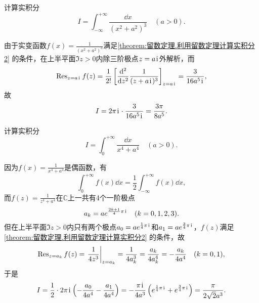 \begin{example}
计算实积分\[
I = \int_{-\infty}^{+\infty} \frac{\dd{x}}{(x^2+a^2)^3} \quad(a>0).
\]
\begin{solution}
由于实变函数\(f(x) = \frac{1}{(x^2+a^2)^3}\)满足\cref{theorem:留数定理.利用留数定理计算实积分2} 的条件，在上半平面\(\Im z > 0\)内除三阶极点\(z=a\kern1pt\mathrm{i}\kern1pt\)外解析，而\[
\operatorname{Res}_{z=a\kern1pt\mathrm{i}\kern1pt} f(z)
= \frac{1}{2!} \left[ \dv[2]{z} \frac{1}{(z+a\kern1pt\mathrm{i}\kern1pt)^3} \right]_{z=a\kern1pt\mathrm{i}\kern1pt}
= \frac{3}{16a^5\kern1pt\mathrm{i}\kern1pt},
\]故\[
I = 2\pi\kern1pt\mathrm{i}\kern1pt \cdot \frac{3}{16a^5\kern1pt\mathrm{i}\kern1pt} = \frac{3\pi}{8a^5}.
\]
\end{solution}
\end{example}

\begin{example}
计算实积分\[
I = \int_0^{+\infty} \frac{\dd{x}}{x^4+a^4} \quad(a>0).
\]
\begin{solution}
因为\(f(x) = \frac{1}{x^4+a^4}\)是偶函数，有\[
\int_0^{+\infty} f(x) \dd{x} = \frac{1}{2} \int_{-\infty}^{+\infty} f(x) \dd{x},
\]而\(f(z) = \frac{1}{z^4+a^4}\)在\(\mathbb{C}\)上一共有4个一阶极点\[
a_k = a e^{\frac{2k+1}{4}\pi\kern1pt\mathrm{i}\kern1pt} \quad(k=0,1,2,3).
\]但在上半平面\(\Im z > 0\)内只有两个极点\(a_0 = a e^{\frac{1}{4}\pi\kern1pt\mathrm{i}\kern1pt}\)和\(a_1 = a e^{\frac{3}{4}\pi\kern1pt\mathrm{i}\kern1pt}\)，\(f(z)\)满足\cref{theorem:留数定理.利用留数定理计算实积分2} 的条件，故\[
\Res_{z=a_k} f(z)
= \eval{\frac{1}{4z^3}}_{z=a_k}
= \frac{1}{4a_k^3}
= \frac{a_k}{4a_k^4}
= -\frac{a_k}{4a^4}
\quad(k=0,1),
\]于是\[
I = \frac{1}{2} \cdot 2\pi\kern1pt\mathrm{i}\kern1pt \left(-\frac{a_0}{4a^4}-\frac{a_1}{4a^4}\right)
= -\frac{\pi\kern1pt\mathrm{i}\kern1pt}{4a^3} \left(e^{\frac{1}{4}\pi\kern1pt\mathrm{i}\kern1pt} + e^{\frac{3}{4}\pi\kern1pt\mathrm{i}\kern1pt}\right)
= \frac{\pi}{2\sqrt{2}a^3}.
\]
\end{solution}
\end{example}

